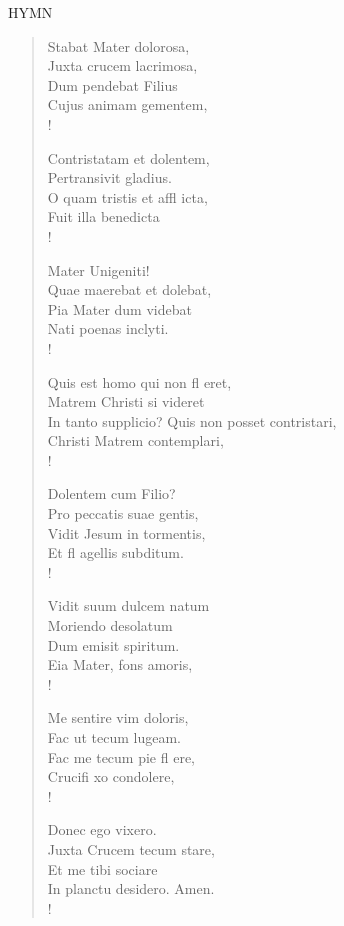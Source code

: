 \noindent\small{\uppercase{Hymn}}\normalsize\label{bvm:stabatmater}
\begin{verse}
Stabat Mater dolorosa,\\
Juxta crucem lacrimosa,\\
Dum pendebat Filius\\
Cujus animam gementem,\\!

Contristatam et dolentem,\\
Pertransivit gladius.\\
O quam tristis et affl icta,\\
Fuit illa benedicta\\!

Mater Unigeniti!\\
Quae maerebat et dolebat,\\
Pia Mater dum videbat\\
Nati poenas inclyti.\\!

Quis est homo qui non fl eret,\\
Matrem Christi si videret\\
In tanto supplicio? Quis non posset contristari,\\
Christi Matrem contemplari,\\!

Dolentem cum Filio?\\
Pro peccatis suae gentis,\\
Vidit Jesum in tormentis,\\
Et fl agellis subditum.\\!

Vidit suum dulcem natum\\
Moriendo desolatum\\
Dum emisit spiritum.\\
Eia Mater, fons amoris,\\!

Me sentire vim doloris,\\
Fac ut tecum lugeam.\\
Fac me tecum pie fl ere,\\
Crucifi xo condolere,\\!

Donec ego vixero.\\
Juxta Crucem tecum stare,\\
Et me tibi sociare\\
In planctu desidero. Amen.\\!
\end{verse}

